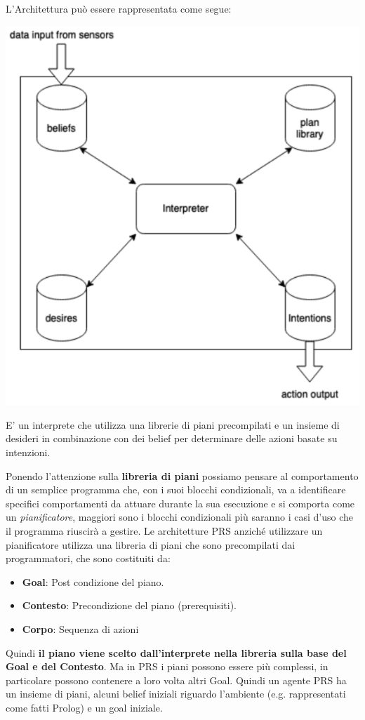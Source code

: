 L'Architettura può essere rappresentata come segue:
\begin{center}
    \includegraphics[scale=0.4]{images/PRS.png}
\end{center}
E' un interprete che utilizza una librerie di piani precompilati e un insieme di desideri in combinazione con dei belief per determinare delle azioni basate su intenzioni.

Ponendo l'attenzione sulla \textbf{libreria di piani} possiamo pensare al comportamento di un semplice programma che, con i suoi blocchi condizionali, va a identificare specifici comportamenti da attuare durante la sua esecuzione e si comporta come un \textit{pianificatore}, maggiori sono i blocchi condizionali più saranno i casi d'uso che il programma riuscirà a gestire. 
Le architetture PRS anziché utilizzare un pianificatore utilizza una libreria di piani che sono precompilati dai programmatori, che sono costituiti da:
\begin{itemize}
    \item \textbf{Goal}: Post condizione del piano.
    \item \textbf{Contesto}: Precondizione del piano (prerequisiti).
    \item \textbf{Corpo}: Sequenza di azioni
\end{itemize}
Quindi \textbf{il piano viene scelto dall'interprete nella libreria sulla base del Goal e del Contesto}. Ma in PRS i piani possono essere più complessi, in particolare possono contenere a loro volta altri Goal.
Quindi un agente PRS ha un insieme di piani, alcuni belief iniziali riguardo l'ambiente (e.g. rappresentati come fatti Prolog) e un goal iniziale.